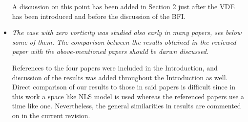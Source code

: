 \documentclass[a4paper,11pt]{article}
\begin{document}
\begin{itemize}
A discussion on this point has been added in Section 2 just after the VDE has been introduced and before the discussion of the BFI.  

\item {\it The case with zero vorticity was studied also early in many papers, see below some of them. The comparison between the results obtained in the reviewed paper with the above-mentioned papers should be darwn discussed.} 

References to the four papers were included in the Introduction, and discussion of the results was added throughout the Introduction as well.  Direct comparison of our results to those in said papers is difficult since in this work a space like NLS model is used whereas the referenced papers use a time like one.  Nevertheless, the general similarities in results are commented on in the current revision.   
\end{itemize}
\end{document}
